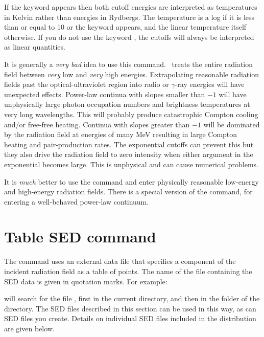If the keyword  appears then both cutoff energies
are interpreted
as temperatures in Kelvin rather than energies in Rydbergs.
The temperature
is a log if it is less than or equal to 10 or the keyword  appears,
and the linear temperature itself otherwise.
If you do not use the keyword , the cutoffs will always be
interpreted as linear quantities.

It is generally a \emph{very bad} idea to use this command.
\Cloudy\ treats the
entire radiation field between \emph{very} low and
\emph{very} high energies.
Extrapolating
reasonable radiation fields past the optical-ultraviolet region into
radio or $\gamma$-ray
energies will have unexpected effects.
Power-law continua with slopes
smaller than $-1$ will have unphysically large photon occupation numbers
and brightness temperatures at very long wavelengths.
This will probably produce
catastrophic Compton cooling and/or free-free heating.
Continua with slopes
greater than $-1$ will be dominated by the radiation field at energies of
many MeV resulting in large Compton heating and pair-production rates.
The exponential cutoffs can prevent this but they also drive the
radiation field
to zero intensity when either argument in the exponential becomes large.
This is unphysical and can cause numerical problems.

It is \emph{much} better to use the  command
and enter physically reasonable low-energy and high-energy radiation fields.
There is a special version of the command, 
for entering a well-behaved power-law continuum.

\section{Table SED command}
\label{sec:CommandTableSED}

The  command uses an external data file 
that specifies a component of the incident radiation field as a table of points.
The name of the file containing the SED data is given in quotation marks. For example:

\noindent
{}

\noindent
will search for the file , 
first in the current directory, and then in the
 folder of the  directory.  
The SED files described in this section can be used in this way, 
as can SED files you create.
Details on individual SED files included in the distribution
are given below.

